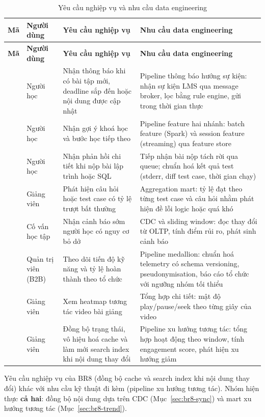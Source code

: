 {\small
\begin{longtable}{@{}L{1.0cm}L{2.2cm}L{4.6cm}L{6.6cm}@{}}
\caption{Yêu cầu nghiệp vụ và nhu cầu data engineering}\label{tab:br}\\
\toprule
\textbf{Mã} & \textbf{Người dùng} & \textbf{Yêu cầu nghiệp vụ} & \textbf{Nhu cầu data engineering} \\
\midrule
\endfirsthead
\toprule
\textbf{Mã} & \textbf{Người dùng} & \textbf{Yêu cầu nghiệp vụ} & \textbf{Nhu cầu data engineering} \\
\midrule
\endhead
{} & Người học & Nhận thông báo khi có bài tập mới, deadline sắp đến hoặc nội dung được cập nhật & Pipeline thông báo hướng sự kiện: nhận sự kiện LMS qua message broker, lọc bằng rule engine, gửi trong thời gian thực \\
 & Người học & Nhận gợi ý khoá học và bước học tiếp theo & Pipeline feature hai nhánh: batch feature (Spark) và session feature (streaming) qua feature store \\
 & Người học & Nhận phản hồi chi tiết khi nộp bài lập trình hoặc SQL & Tiếp nhận bài nộp tách rời qua queue; chuẩn hoá kết quả test (stderr, diff test case, thời gian chạy) \\
 & Giảng viên & Phát hiện câu hỏi hoặc test case có tỷ lệ trượt bất thường & Aggregation mart: tỷ lệ đạt theo từng test case và câu hỏi nhằm phát hiện đề lỗi logic hoặc quá khó \\
 & Cố vấn học tập & Nhận cảnh báo sớm người học có nguy cơ bỏ dở & CDC và sliding window: đọc thay đổi từ OLTP, tính điểm rủi ro, phát sinh cảnh báo \\
 & Quản trị viên (B2B) & Theo dõi tiến độ kỹ năng và tỷ lệ hoàn thành theo tổ chức & Pipeline medallion: chuẩn hoá telemetry có schema versioning, pseudonymisation, báo cáo tổ chức với ngưỡng nhóm tối thiểu \\
 & Giảng viên & Xem heatmap tương tác video bài giảng & Tổng hợp chi tiết: mật độ play/pause/seek theo từng giây của video \\
 & Giảng viên & Đồng bộ trạng thái, vô hiệu hoá cache và làm mới search index khi nội dung thay đổi & Pipeline xu hướng tương tác: tổng hợp hoạt động theo window, tính engagement score, phát hiện xu hướng giảm \\
\bottomrule
\end{longtable}}

\begin{notebox}[title=Nhận xét về BR8]
Yêu cầu nghiệp vụ của BR8 (đồng bộ cache và search index khi nội dung thay đổi) khác với nhu cầu kỹ thuật đi kèm (pipeline xu hướng tương tác). Nhóm hiện thực \textbf{cả hai}: đồng bộ nội dung dựa trên CDC (Mục~\ref{sec:br8-sync}) và mart xu hướng tương tác (Mục~\ref{sec:br8-trend}).
\end{notebox}

